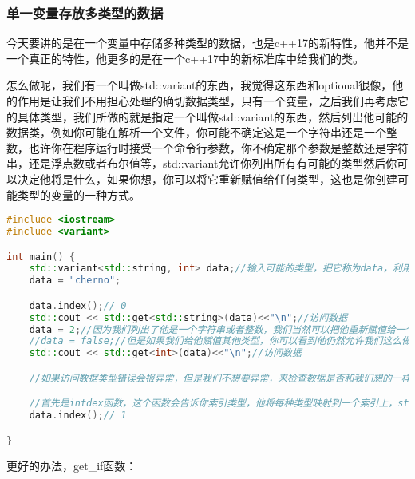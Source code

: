 \subsubsection{单一变量存放多类型的数据}

今天要讲的是在一个变量中存储多种类型的数据，也是c++17的新特性，他并不是一个真正的特性，他更多的是在一个c++17中的新标准库中给我们的类。

怎么做呢，我们有一个叫做{\ncodestyle std::variant}的东西，我觉得这东西和optional很像，他的作用是让我们不用担心处理的确切数据类型，只有一个变量，之后我们再考虑它的具体类型，我们所做的就是指定一个叫做{\ncodestyle std::variant}的东西，然后列出他可能的数据类，例如你可能在解析一个文件，你可能不确定这是一个字符串还是一个整数，也许你在程序运行时接受一个命令行参数，你不确定那个参数是整数还是字符串，还是浮点数或者布尔值等，{\ncodestyle std::variant}允许你列出所有有可能的类型然后你可以决定他将是什么，如果你想，你可以将它重新赋值给任何类型，这也是你创建可能类型的变量的一种方式。

\begin{lstlisting}[language=c++]
#include <iostream>
#include <variant>

int main() {
    std::variant<std::string, int> data;//输入可能的类型，把它称为data，利用构造函数给他赋值，但是为了更明确一点，我们也可以使用赋值操作符
    data = "cherno";

    data.index();// 0
    std::cout << std::get<std::string>(data)<<"\n";//访问数据
    data = 2;//因为我们列出了他是一个字符串或者整数，我们当然可以把他重新赋值给一个字符串或整数
    //data = false;//但是如果我们给他赋值其他类型，你可以看到他仍然允许我们这么做，但是如果我们这样做，我们实际上以后就不能访问他了，这不是我们想要的
    std::cout << std::get<int>(data)<<"\n";//访问数据

    //如果访问数据类型错误会报异常，但是我们不想要异常，来检查数据是否和我们想的一样，我们有几种方法

    //首先是intdex函数，这个函数会告诉你索引类型，他将每种类型映射到一个索引上，string是0，int是1，在本例中他将会告诉我们数据当前存储在哪个索引中
    data.index();// 1

}
\end{lstlisting}


更好的办法，{\ncodestyle get_if}函数：


